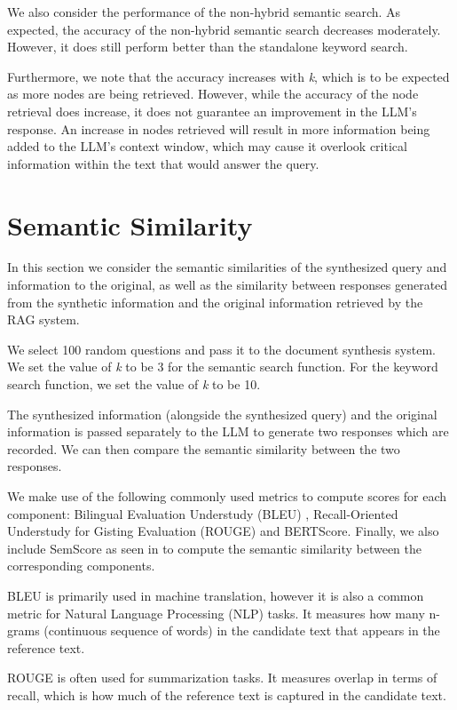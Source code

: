 We also consider the performance of the non-hybrid semantic search. As expected, the accuracy of the non-hybrid semantic search decreases moderately. However, it does still perform better than the standalone keyword search.

Furthermore, we note that the accuracy increases with \textit{k}, which is to be expected as more nodes are being retrieved. However, while the accuracy of the node retrieval does increase, it does not guarantee an improvement in the LLM's response. An increase in nodes retrieved will result in more information being added to the LLM's context window, which may cause it overlook critical information within the text that would answer the query.

\section{Semantic Similarity}

In this section we consider the semantic similarities of the synthesized query and information to the original, as well as the similarity between responses generated from the synthetic information and the original information retrieved by the RAG system.

We select 100 random questions and pass it to the document synthesis system. We set the value of \textit{k} to be 3 for the semantic search function. For the keyword search function, we set the value of \textit{k} to be 10.

The synthesized information (alongside the synthesized query) and the original information is passed separately to the LLM to generate two responses which are recorded. We can then compare the semantic similarity between the two responses.

We make use of the following commonly used metrics to compute scores for each component: Bilingual Evaluation Understudy (BLEU) , Recall-Oriented Understudy for Gisting Evaluation (ROUGE) and BERTScore. Finally, we also include SemScore as seen in \autocite{aynetdinov2024semscoreautomatedevaluationinstructiontuned} to compute the semantic similarity between the corresponding components.

BLEU is primarily used in machine translation, however it is also a common metric for Natural Language Processing (NLP) tasks. It measures how many n-grams (continuous sequence of words) in the candidate text that appears in the reference text.

ROUGE is often used for summarization tasks. It measures overlap in terms of recall, which is how much of the reference text is captured in the candidate text.

